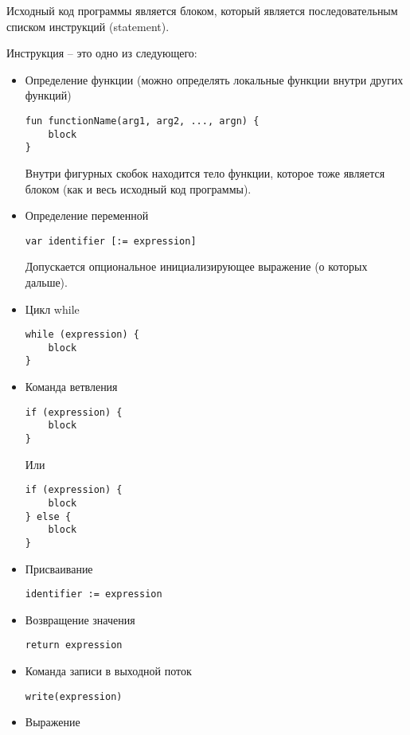 Исходный код программы является блоком, который является последовательным списком
инструкций (statement).

Инструкция -- это одно из следующего:
\begin{itemize}
    \item Определение функции (можно определять локальные функции внутри других функций)
\begin{lstlisting}
fun functionName(arg1, arg2, ..., argn) {
    block
}
\end{lstlisting}
    Внутри фигурных скобок находится тело функции, которое тоже является блоком
    (как и весь исходный код программы).\\
    
    \item Определение переменной
\begin{lstlisting}
var identifier [:= expression]
\end{lstlisting}
    Допускается опциональное инициализирующее выражение (о которых дальше).\\
    
    \item Цикл while
\begin{lstlisting}
while (expression) {
    block
}
\end{lstlisting}
    
    \item Команда ветвления
\begin{lstlisting}
if (expression) {
    block
}
\end{lstlisting}
    Или
\begin{lstlisting}
if (expression) {
    block
} else {
    block
}
\end{lstlisting}
    
    \item Присваивание
\begin{lstlisting}
identifier := expression
\end{lstlisting}

    \item Возвращение значения
\begin{lstlisting}
return expression
\end{lstlisting}
    
    \item Команда записи в выходной поток
\begin{lstlisting}
write(expression)
\end{lstlisting}
    
    \item Выражение\\
\end{itemize}


